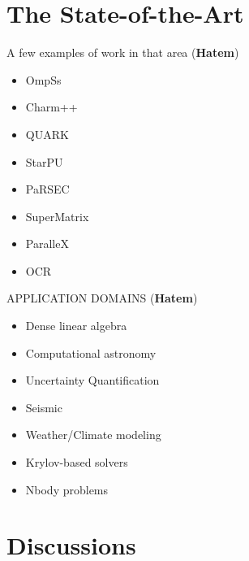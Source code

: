\section{The State-of-the-Art}

A few examples of work in that area  (\textbf{Hatem})
\begin{itemize}
	\item OmpSs
	\item Charm++
	\item QUARK
	\item StarPU
	\item PaRSEC
	\item SuperMatrix
	\item ParalleX
	\item OCR
\end{itemize}

APPLICATION DOMAINS  (\textbf{Hatem})
		\begin{itemize}
			\item Dense linear algebra
			\item Computational astronomy
			\item Uncertainty Quantification
			\item Seismic
			\item Weather/Climate modeling
			\item Krylov-based solvers
			\item Nbody problems
		\end{itemize}

\section{Discussions}

